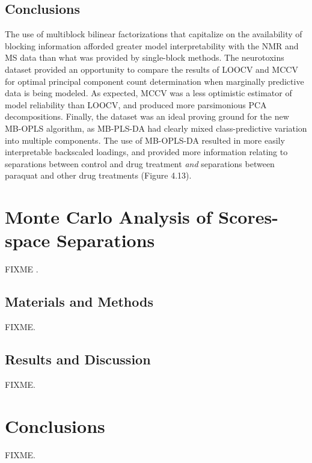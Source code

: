 \subsection{Conclusions}

\begin{doublespace}
The use of multiblock bilinear factorizations that capitalize on the
availability of blocking information afforded greater model interpretability
with the NMR and MS data than what was provided by single-block methods. The
neurotoxins dataset provided an opportunity to compare the results of LOOCV
and MCCV for optimal principal component count determination when marginally
predictive data is being modeled. As expected, MCCV was a less optimistic
estimator of model reliability than LOOCV, and produced more parsimonious PCA
decompositions. Finally, the dataset was an ideal proving ground for the new
MB-OPLS algorithm, as MB-PLS-DA had clearly mixed class-predictive variation
into multiple components. The use of MB-OPLS-DA resulted in more easily
interpretable backscaled loadings, and provided more information relating to
separations between control and drug treatment \emph{and} separations between
paraquat and other drug treatments (Figure 4.13).
\end{doublespace}

\section{Monte Carlo Analysis of Scores-space Separations}

\begin{doublespace}
FIXME \cite{worley:anchem2015}.
\end{doublespace}

\subsection{Materials and Methods}

\begin{doublespace}
FIXME.
\end{doublespace}

\subsection{Results and Discussion}

\begin{doublespace}
FIXME.
\end{doublespace}

\section{Conclusions}

\begin{doublespace}
FIXME.
\end{doublespace}




